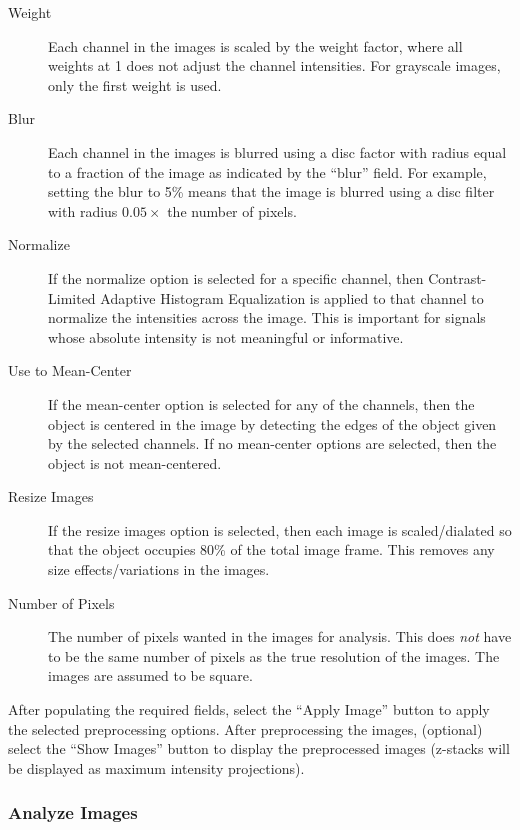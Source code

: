 \documentclass[12pt]{article}
\begin{document}
\begin{description}
\item[Weight] Each channel in the images is scaled by the weight factor, where all weights at 1 does not adjust the channel intensities. For grayscale images, only the first weight is used. 
%
\item[Blur] Each channel in the images is blurred using a disc factor with radius equal to a fraction of the image as indicated by the ``blur'' field. For example, setting the blur to 5\% means that the image is blurred using a disc filter with radius $0.05 \times$ the number of pixels. 
%
\item[Normalize] If the normalize option is selected for a specific channel, then Contrast-Limited Adaptive Histogram Equalization is applied to that channel to normalize the intensities across the image. This is important for signals whose absolute intensity is not meaningful or informative. 
%
\item[Use to Mean-Center] If the mean-center option is selected for any of the channels, then the object is centered in the image by detecting the edges of the object given by the selected channels. If no mean-center options are selected, then the object is not mean-centered.
%
\item[Resize Images] If the resize images option is selected, then each image is scaled/dialated so that the object occupies 80\% of the total image frame. This removes any size effects/variations in the images. 
%
\item[Number of Pixels] The number of pixels wanted in the images for analysis. This does {\em not} have to be the same number of pixels as the true resolution of the images. The images are assumed to be square. 
%
\end{description}

After populating the required fields, select the ``Apply Image'' button to apply the selected preprocessing options.
%
After preprocessing the images, (optional) select the ``Show Images'' button to display the preprocessed images (z-stacks will be displayed as maximum intensity projections).

\subsubsection{Analyze Images}
\end{document}
